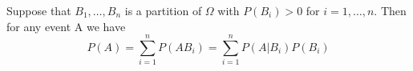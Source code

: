 \documentclass{tufte-handout}
\makeatletter
\renewcommand{\section}{\@startsection{section} %
    {3}{-1.01em}{-3ex \@plus -1ex \@minus -.2ex}%
    {1.5ex \@plus .2ex}
    {\hspace*{-5.5em}\fcolorbox{blue}{blue}{\parbox[c][1.0ex][b]{4em}{\phantom{space}}}
    \normalfont\Large\itshape\color{blue}}}
\makeatother
\begin{document}
        \begin{Theorem}
            Suppose that $ B_{1}, \dots , B_{n } $ is a partition of $ \Omega $ with $ P(B_{i }) >0$
            for $ i = 1, \dots, n $. Then for any event A we have 
            \[P(A) = \sum_{i=1}^{n }P(AB_{i }) = \sum_{i=1}^{n }P(A|B_{i })P(B_{i })\]
        \end{Theorem}



\makeatletter
  \renewcommand{\section}{\@startsection{section} %
    {3}{0.8em}{-3ex \@plus -1ex \@minus -.2ex}%
    {1.5ex \@plus .2ex}
    {\hspace*{-5.5em}\fcolorbox{Periwinkle}{Periwinkle}{\parbox[c][1.0ex][b]{4em}{\phantom{space}}}
    \normalfont\Large\itshape\color{blue}}}
\makeatother



\end{document}

